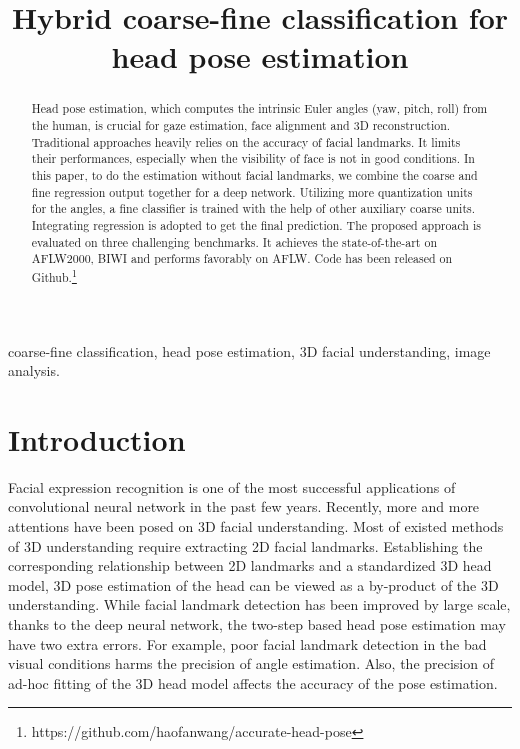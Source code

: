 \documentclass{article}
\title{Hybrid coarse-fine classification for head pose estimation}
\begin{document}
\begin{CJK*}{UTF8}{gkai}
\maketitle


\begin{abstract}
Head pose estimation, which computes the intrinsic Euler angles (yaw, pitch, roll) from the human, is crucial for gaze estimation, face alignment and 3D reconstruction. Traditional approaches heavily relies on the accuracy of facial landmarks. It limits their performances, especially when the visibility of face is not in good conditions. In this paper, to do the estimation without facial landmarks,  we combine the coarse and fine regression output together for a deep network.  Utilizing more quantization units for the angles, a fine classifier is trained with the help of other auxiliary coarse units. Integrating regression is adopted to get the final prediction. The proposed approach is evaluated on three challenging benchmarks. It achieves the state-of-the-art on AFLW2000, BIWI and performs favorably on AFLW. Code has been released on Github.\renewcommand{\thefootnote}{\fnsymbol{footnote}}\footnote{https://github.com/haofanwang/accurate-head-pose\label{web}}

\end{abstract}

\begin{keywords}
coarse-fine classification, head pose estimation, 3D facial understanding, image analysis.
\end{keywords}



\section{Introduction}
\label{sec:intro}
    Facial expression recognition is one of the most successful applications of convolutional neural network in the past few years. Recently, more and more attentions have been posed on 3D facial understanding. Most of existed methods of 3D understanding require extracting 2D facial landmarks. Establishing the corresponding relationship between 2D landmarks and a standardized 3D head model, 3D pose estimation of the head can be viewed as a by-product of the 3D understanding. While facial landmark detection has been improved by large scale, thanks to the deep neural network, the two-step based head pose estimation may have two extra errors.
    For example, poor facial landmark detection in the bad visual conditions harms the precision of angle estimation. Also, the precision of ad-hoc fitting of the 3D head model affects the accuracy of the pose estimation.


\end{CJK*}
\end{document}
